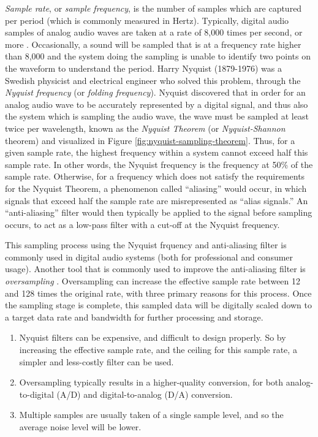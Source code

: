 \textit{Sample rate}, or \textit{sample frequency}, is the number of samples which are captured per period (which is commonly measured in Hertz). Typically, digital audio samples of analog audio waves are taken at a rate of 8,000 times per second, or more \cite{Zjalic_2021}. Occasionally, a sound will be sampled that is at a frequency rate higher than 8,000 and the system doing the sampling is unable to identify two points on the waveform to understand the period. Harry Nyquist (1879-1976) was a Swedish physicist and electrical engineer who solved this problem, through the \textit{Nyquist frequency} (or \textit{folding frequency}). Nyquist discovered that in order for an analog audio wave to be accurately represented by a digital signal, and thus also the system which is sampling the audio wave, the wave must be sampled at least twice per wavelength, known as the \textit{Nyquist Theorem} (or \textit{Nyquist-Shannon} theorem) \cite{Zjalic_2021} and visualized in Figure \ref{fig:nyquist-sampling-theorem}. Thus, for a given sample rate, the highest frequency within a system cannot exceed half this sample rate. In other words, the Nyquist frequency is the frequency at 50\% of the sample rate. Otherwise, for a frequency which does not satisfy the requirements for the Nyquist Theorem, a phenomenon called ``aliasing'' would occur, in which signals that exceed half the sample rate are misrepresented as ``alias signals.'' An ``anti-aliasing'' filter would then typically be applied to the signal before sampling occurs, to act as a low-pass filter with a cut-off at the Nyquist frequency. 

This sampling process using the Nyquist frquency and anti-aliasing filter is commonly used in digital audio systems (both for professional and consumer usage). Another tool that is commonly used to improve the anti-aliasing filter is \textit{oversampling} \cite{Huber_Runstein_2018}. Oversampling can increase the effective sample rate between 12 and 128 times the original rate, with three primary reasons for this process. Once the sampling stage is complete, this sampled data will be digitally scaled down to a target data rate and bandwidth for further processing and storage.

\begin{enumerate}
	\item Nyquist filters can be expensive, and difficult to design properly. So by increasing the effective sample rate, and the ceiling for this sample rate, a simpler and less-costly filter can be used.
	\item Oversampling typically results in a higher-quality conversion, for both analog-to-digital (A/D) and digital-to-analog (D/A) conversion.
	\item Multiple samples are usually taken of a single sample level, and so the average noise level will be lower.
\end{enumerate}

